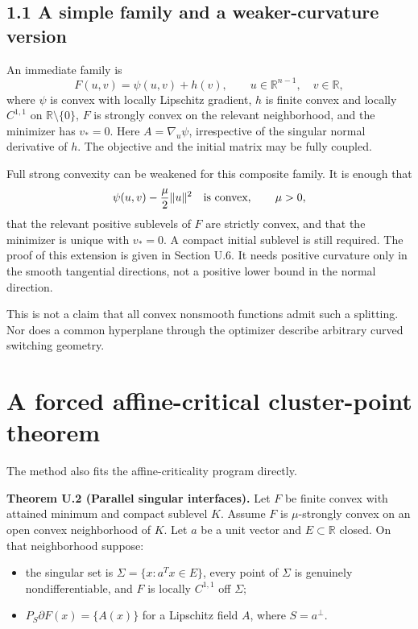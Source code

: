 \subsection{1.1 A simple family and a weaker-curvature
version}\label{U:a-simple-family-and-a-weaker-curvature-version}

An immediate family is \[
 \boxed{F(u,v)=\psi(u,v)+h(v),\qquad u\in\mathbb R^{n-1},\quad v\in\mathbb R,}
\] where \(\psi\) is convex with locally Lipschitz gradient, \(h\) is
finite convex and locally \(C^{1,1}\) on \(\mathbb R\setminus\{0\}\),
\(F\) is strongly convex on the relevant neighborhood, and the minimizer
has \(v_*=0\). Here \(A=\nabla_u\psi\), irrespective of the singular
normal derivative of \(h\). The objective and the initial matrix may be
fully coupled.

Full strong convexity can be weakened for this composite family. It is
enough that \[
 \psi(u,v)-\frac{\mu}{2}\|u\|^2\quad\hbox{is convex},\qquad \mu>0,
\] that the relevant positive sublevels of \(F\) are strictly convex,
and that the minimizer is unique with \(v_*=0\). A compact initial
sublevel is still required. The proof of this extension is given in
Section U.6. It needs positive curvature only in the smooth tangential
directions, not a positive lower bound in the normal direction.

This is not a claim that all convex nonsmooth functions admit such a
splitting. Nor does a common hyperplane through the optimizer describe
arbitrary curved switching geometry.


\setcounter{section}{1}
\setcounter{theorem}{0}
\setcounter{lemma}{0}
\setcounter{corollary}{0}
\setcounter{proposition}{0}
\setcounter{remark}{0}
\setcounter{equation}{0}
\section{A forced affine-critical cluster-point
theorem}\label{U:a-forced-affine-critical-cluster-point-theorem}

The method also fits the affine-criticality program directly.

\label{U:parallel}\textbf{Theorem U.2 (Parallel singular interfaces).} Let \(F\) be finite
convex with attained minimum and compact sublevel \(K\). Assume \(F\) is
\(\mu\)-strongly convex on an open convex neighborhood of \(K\). Let
\(a\) be a unit vector and \(E\subset\mathbb R\) closed. On that
neighborhood suppose:

\begin{itemize}
\tightlist
\item
  the singular set is \(\Sigma=\{x:a^Tx\in E\}\), every point of
  \(\Sigma\) is genuinely nondifferentiable, and \(F\) is locally
  \(C^{1,1}\) off \(\Sigma\);
\item
  \(P_S\partial F(x)=\{A(x)\}\) for a Lipschitz field \(A\), where
  \(S=a^\perp\).
\end{itemize}

